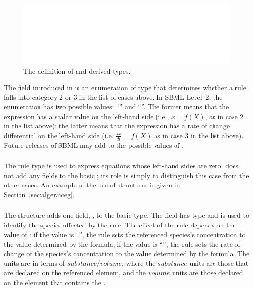 \documentclass[10pt]{cekarticle}
\begin{document}
\begin{figure}[htb]
  \centering
  \includegraphics[scale = 0.68]{rule}
  \caption{The definition of  and derived types.}
  \label{fig:rules}
\end{figure}

The  field introduced in  is an
enumeration of type  that determines whether a
rule falls into category 2 or 3 in the list of cases above.  In
SBML Level~2, the enumeration has two possible values:
``'' and ``''.  The former means that
the expression has a scalar value on the left-hand side (i.e., $x
= f(X)$, as in case 2 in the list above); the latter means that
the expression has a rate of change differential on the left-hand
side (i.e. $\frac{d x}{d t} = f(X)$ as in case 3 in the list above). Future releases of SBML may
add to the possible values of .

\subsubsection{}

The rule type  is used to express equations
whose left-hand sides are zero.   does not
add any fields to the basic ; its role is simply to
distinguish this case from the other cases.  An example of the use
of  structures is given in
Section~\ref{sec:algeraiceg}.

\subsubsection{}

The  structure adds one field,
, to the basic  type.  The
field  has type  and is used to
identify the species affected by the rule.  The effect of the rule
depends on the value of : if the value is
``'', the rule sets the referenced species's
concentration to the value determined by the formula; if the value
is ``'', the rule sets the rate of change of the
species's concentration to the value determined by the formula.
The units are in terms of $substance/volume$, where the
$substance$ units are those that are declared on the referenced
 element, and the $volume$ units are those declared
on the  element that contains the
.
\end{document}
